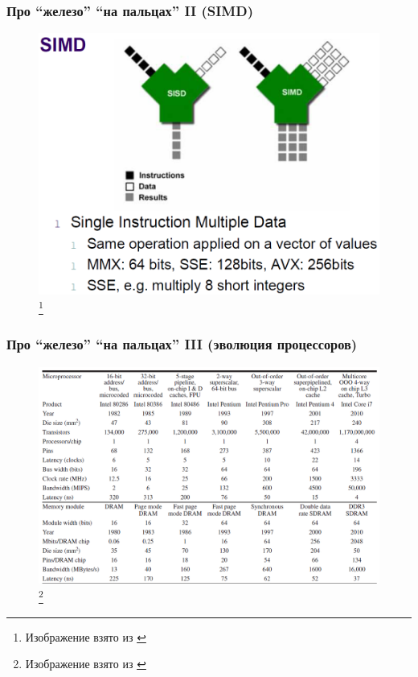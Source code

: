 \documentclass{beamer}
\begin{document}
\begin{frame}
\frametitle{Про ``железо'' ``на пальцах'' II (SIMD)}

\begin{figure}[htb]
\includegraphics[width=\textwidth,height=0.750\textheight,keepaspectratio]{simd.png} 
\footnote{\tiny{Изображение взято из \cite{Harizopoulos2009}}}
\end{figure}    
  
\end{frame}


\begin{frame}
\frametitle{Про ``железо'' ``на пальцах'' III (эволюция процессоров)}

\begin{figure}[htb]
\includegraphics[width=\textwidth,height=0.750\textheight,keepaspectratio]{stats2.png} 
\footnote{\tiny{Изображение взято из \cite{Hennessy2011}}}
\end{figure}    
  
\end{frame}
\end{document}

